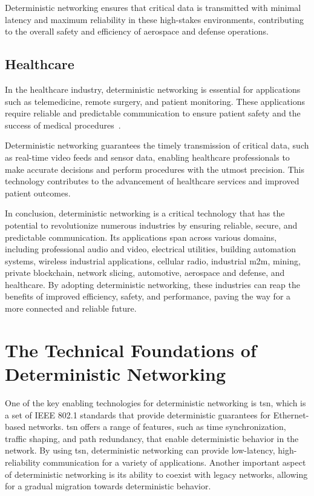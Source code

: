 \documentclass[runningheads]{llncs}
\begin{document}
Deterministic networking ensures that critical data is transmitted with minimal latency and maximum reliability in these high-stakes environments, contributing to the overall safety and efficiency of aerospace and defense operations.

\subsection{Healthcare}
In the healthcare industry, deterministic networking is essential for applications such as telemedicine, remote surgery, and patient monitoring. These applications require reliable and predictable communication to ensure patient safety and the success of medical procedures~\cite{Zhang2022}.

Deterministic networking guarantees the timely transmission of critical data, such as real-time video feeds and sensor data, enabling healthcare professionals to make accurate decisions and perform procedures with the utmost precision. This technology contributes to the advancement of healthcare services and improved patient outcomes.

In conclusion, deterministic networking is a critical technology that has the potential to revolutionize numerous industries by ensuring reliable, secure, and predictable communication. Its applications span across various domains, including professional audio and video, electrical utilities, building automation systems, wireless industrial applications, cellular radio, industrial \gls{m2m}, mining, private blockchain, network slicing, automotive, aerospace and defense, and healthcare. By adopting deterministic networking, these industries can reap the benefits of improved efficiency, safety, and performance, paving the way for a more connected and reliable future.

\section{The Technical Foundations of Deterministic Networking}
One of the key enabling technologies for deterministic networking is \gls{tsn}, which is a set of IEEE 802.1 standards that provide deterministic guarantees for Ethernet-based networks. \gls{tsn} offers a range of features, such as time synchronization, traffic shaping, and path redundancy, that enable deterministic behavior in the network. By using \gls{tsn}, deterministic networking can provide low-latency, high-reliability communication for a variety of applications. Another important aspect of deterministic networking is its ability to coexist with legacy networks, allowing for a gradual migration towards deterministic behavior.
\end{document}
